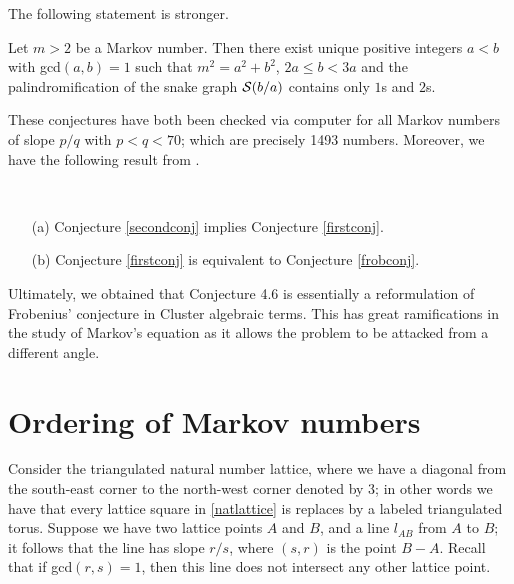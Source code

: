 The following statement is stronger.
\begin{conjecture}\label{secondconj}
    Let $m>2$ be a Markov number. Then there exist unique positive integers $a<b$ with gcd$(a,b) = 1$ such that $m^2 = a^2 + b^2$, $2a \leq b < 3a$ and the palindromification of the snake graph $\mathcal{S}(b/a)$ contains only $1$s and $2$s.
\end{conjecture}
These conjectures have both been checked via computer for all Markov numbers of slope $p/q$ with $p < q < 70$; which are precisely 1493 numbers. Moreover, we have the following result from \cite{CS1}.
\begin{theorem}~
    \begin{itemize}
        \item[(a)] Conjecture \ref{secondconj} implies Conjecture \ref{firstconj}.
        \item[(b)] Conjecture \ref{firstconj} is equivalent to Conjecture \ref{frobconj}.
    \end{itemize}
\end{theorem}
Ultimately, we obtained that Conjecture 4.6 is essentially a reformulation of Frobenius' conjecture in Cluster algebraic terms. This has great ramifications in the study of Markov's equation as it allows the problem to be attacked from a different angle. 
\section{Ordering of Markov numbers}
Consider the triangulated natural number lattice, where we have a diagonal from the south-east corner to the north-west corner denoted by 3; in other words we have that every lattice square in \ref{natlattice} is replaces by a labeled triangulated torus. Suppose we have two lattice points $A$ and $B$, and a line $l_{AB}$ from $A$ to $B$; it follows that the line has slope $r/s$, where $(s,r)$ is the point $B-A$. Recall that if gcd$(r,s) =  1$, then this line does not intersect any other lattice point. 


